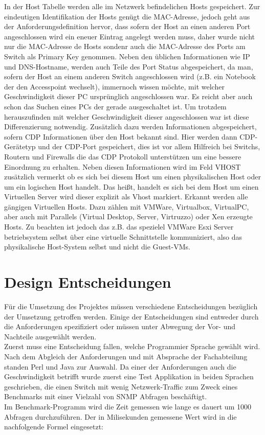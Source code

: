 In der Host Tabelle werden alle im Netzwerk befindelichen Hosts gespeichert. Zur eindeutigen Identifikation der Hosts genügt die MAC-Adresse, jedoch geht aus der Anforderungsdefinition hervor, dass sofern der Host an einen anderen Port angeschlossen wird ein eneuer Eintrag angelegt werden muss, daher wurde nicht nur die MAC-Adresse de Hosts sondenr auch die MAC-Adresse des Ports am Switch als Primary Key genommen. Neben den üblichen Informationen wie IP und DNS-Hostname, werden auch Teile des Port Status abgespeichert, da man, sofern der Host an einem anderen Switch angeschlossen wird (z.B. ein Notebook der den Accesspoint wechselt), immernoch wissen möchte, mit welcher Geschwindigkeit dieser PC ursprünglich angeschlossen war. Es reicht aber auch schon das Suchen eines PCs der gerade ausgeschaltet ist. Um trotzdem herauszufinden mit welcher Geschwindigkeit dieser angeschlossen war ist diese Differenzierung notwendig. Zusätzlich dazu werden Informationen abgespeichert, sofern CDP Informationen über den Host bekannt sind. Hier werden dann CDP-Gerätetyp und der CDP-Port gespeichert, dies ist vor allem Hilfreich bei Switchs, Routern und Firewalls die das CDP Protokoll unterstützen um eine bessere Einordnung zu erhalten. Neben diesen Informationen wird im Feld VHOST zusätzlich vermerkt ob es sich bei diesem Host um einen physikalischen Host oder um ein logischen Host handelt. Das heißt, handelt es sich bei dem Host um einen Virtuellen Server wird dieser explizit als Vhost markiert. Erkannt werden alle gängigen Virtuellen Hosts. Dazu zählen mit VMWare, Virtualbox, VirtualPC, aber auch mit Parallels (Virtual Desktop, Server, Virtruzzo) oder Xen erzeugte Hosts. Zu beachten ist jedoch das z.B. das spezielel VMWare Esxi Server betriebsystem selbst über eine virtuelle Schnittstelle kommuniziert, also das physikalische Host-System selbst und nicht die Guest-VMs.


\section{Design Entscheidungen}
\label{sec:designent}

Für die Umsetzung des Projektes müssen verschiedene Entscheidungen bezüglich der Umsetzung getroffen werden. Einige der Entscheidungen sind entweder durch die Anforderungen spezifiziert oder müssen unter Abwegung der Vor- und Nachteile ausgewählt werden.\\
Zuerst muss eine Entscheidung fallen, welche Programmier Sprache gewählt wird. Nach dem Abgleich der Anforderungen und mit Absprache der Fachabteilung standen Perl und Java zur Auswahl. Da einer der Anforderungen auch die Geschwindigkeit betrifft wurde zuerst eine Test Applikation in beiden Sprachen geschrieben, die einen Switch mit wenig Netzwerk-Traffic zum Zweck eines Benchmarks mit einer Vielzahl von SNMP Abfragen beschäftigt.\\
Im Benchmark-Programm wird die Zeit gemessen wie lange es dauert um 1000 Abfragen durchzuführen. Der in Milisekunden gemessene Wert wird in die nachfolgende Formel eingesetzt:\\

